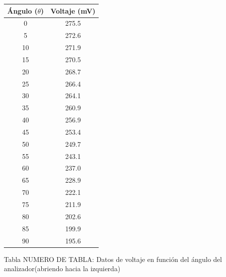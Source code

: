 \documentclass{article}
\begin{document}
\begin{multicols}{2}
	\begin{table}[h]
		\centering
		\begin{tabular}{|c|c|}
			\hline
			Ángulo ($\theta$)& Voltaje (mV) \\
			\hline
			0  & 275.5 \\
			5  & 272.6 \\
			10 & 271.9 \\
			15 & 270.5 \\
			20 & 268.7 \\
			25 & 266.4 \\
			30 & 264.1 \\
			35 & 260.9 \\
			40 & 256.9 \\
			45  & 253.4 \\
			50  & 249.7 \\
			55  & 243.1 \\
			60  & 237.0 \\
			65  & 228.9 \\
			70  & 222.1 \\
			75  & 211.9 \\
			80  & 202.6 \\
			85  & 199.9 \\
			90  & 195.6 \\
			\hline
		\end{tabular}
	\end{table}
	
	\begin{center}
	Tabla NUMERO DE TABLA: Datos de voltaje en función del ángulo del analizador(abriendo hacia la izquierda)
	\end{center}
	\end{multicols}
\end{document}
